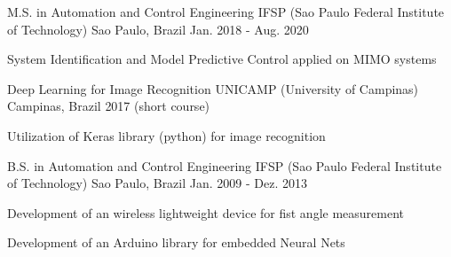 

\begin{cventries}

\cventry
  {M.S. in Automation and Control Engineering} %
  {IFSP (Sao Paulo Federal Institute of Technology)} %
  {Sao Paulo, Brazil} %
  {Jan. 2018 - Aug. 2020} %
  {
    \begin{cvitems} %
      \item {System Identification and Model Predictive Control applied on MIMO systems}
    \end{cvitems}
  }

  \cventry
    {Deep Learning for Image Recognition} %
    {UNICAMP (University of Campinas)} %
    {Campinas, Brazil} %
    {2017 (short course)} %
    {
      \begin{cvitems} %
        \item {Utilization of Keras library (python) for image recognition}
      \end{cvitems}
    }

  \cventry
    {B.S. in Automation and Control Engineering} %
    {IFSP (Sao Paulo Federal Institute of Technology)} %
    {Sao Paulo, Brazil} %
    {Jan. 2009 - Dez. 2013} %
    {
      \begin{cvitems} %
        \item {Development of an wireless lightweight device for fist angle measurement}
        \item {Development of an Arduino library for embedded Neural Nets}
      \end{cvitems}
    }

\end{cventries}
